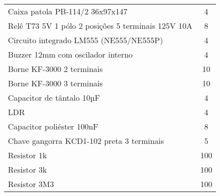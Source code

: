 \begin{table}[hbp]
\begin{tabular}{lc}
        Caixa patola PB-114/2 36x97x147                        & 4                   \\
        Relê T73 5V 1 pólo 2 posições 5 terminais 125V 10A     & 8                   \\
        Circuito integrado LM555 (NE555/NE555P)                & 4                   \\
        Buzzer 12mm com oscilador interno                      & 4                   \\
        Borne KF-3000 2 terminais                              & 10                  \\
        Borne KF-3000 3 terminais                              & 10                  \\
        Capacitor de tântalo 10µF                              & 4                   \\
        LDR                                                    & 4                   \\
        Capacitor poliéster 100nF                              & 8                   \\
        Chave gangorra KCD1-102 preta 3 terminais              & 5                   \\
        Resistor 1k                                            & 100                 \\
        Resistor 3k                                            & 100                 \\
        Resistor 3M3                                           & 100                 \\
        \bottomrule
    \end{tabular}
\end{table}
